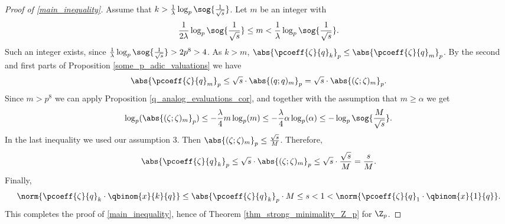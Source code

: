 \begin{proof}[Proof of \ref{main_inequality}]
    Assume that $k> \frac{1}{\lambda}\log_p\sog{\frac{1}{\sqrt{s}}}$.
    Let $m$ be an integer with 
    \[\frac{1}{2\lambda}\log_p\sog{\frac{1}{\sqrt{s}}}\leq m<\frac{1}{\lambda}\log_p\sog{\frac{1}{\sqrt{s}}}.\]
    Such an integer exists, since $\frac{1}{\lambda}\log_p\sog{\frac{1}{\sqrt{s}}}>2p^8> 4$.
    As $k>m$, $\abs{\pcoeff{\zeta}{q}_k}_p\leq\abs{\pcoeff{\zeta}{q}_m}_p$.
    By the second and first parts of Proposition \ref{some_p_adic_valuations} we have
    \[\abs{\pcoeff{\zeta}{q}_m}_p\leq \sqrt{s}\cdot\abs{(q;q)_m}_p=\sqrt{s}\cdot\abs{(\zeta;\zeta)_m}_p.\]
    Since $m>p^8$ we can apply Proposition \ref{q_analog_evaluations_cor}, and together with the assumption that $m\geq\alpha$ we get
        \begin{align*}
        \log_p(\abs{(\zeta;\zeta)_m}_p)
        \leq -\frac{\lambda}{4}m\log_p(m)
        \leq -\frac{\lambda}{4}\alpha\log_p(\alpha)
        \leq -\log_p\sog{\frac{M}{\sqrt{s}}}.
        \end{align*} 
    In the last inequality we used our assumption $3$.
    Then $\abs{(\zeta;\zeta)_m}_p\leq \frac{\sqrt{s}}{M}$.
    Therefore,
    \[\abs{\pcoeff{\zeta}{q}_k}_p\leq \sqrt{s}\cdot \abs{(\zeta;\zeta)_m}_p\leq \sqrt{s}\cdot \frac{\sqrt{s}}{M}=\frac{s}{M}.\]
    Finally,
    \[\norm{\pcoeff{\zeta}{q}_k\cdot\qbinom{x}{k}{q}}\leq \abs{\pcoeff{\zeta}{q}_k}_p\cdot M\leq s<1<\norm{\pcoeff{\zeta}{q}_1\cdot\qbinom{x}{1}{q}}.\]
    This completes the proof of \ref{main_inequality}, hence of Theorem \ref{thm_strong_minimality_Z_p} for $\Z_p$.
    \end{proof} 





